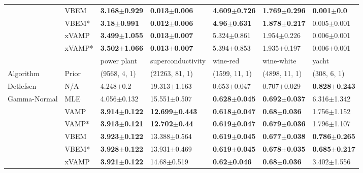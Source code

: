 \begin{tabular}{lllllll}
                 & VBEM &  \textbf{3.168$\pm$0.929} &  \textbf{0.013$\pm$0.006} &  \textbf{4.609$\pm$0.726} &  \textbf{1.769$\pm$0.296} &  \textbf{0.001$\pm$0.0} \\
                 & VBEM* &   \textbf{3.18$\pm$0.991} &  \textbf{0.012$\pm$0.006} &   \textbf{4.96$\pm$0.631} &  \textbf{1.878$\pm$0.217} &         0.005$\pm$0.001 \\
                 & xVAMP &  \textbf{3.499$\pm$1.055} &  \textbf{0.013$\pm$0.007} &           5.324$\pm$0.861 &           1.954$\pm$0.226 &         0.006$\pm$0.001 \\
                 & xVAMP* &  \textbf{3.502$\pm$1.066} &  \textbf{0.013$\pm$0.007} &           5.394$\pm$0.853 &           1.935$\pm$0.197 &         0.006$\pm$0.001 \\
\midrule
                 &        &               power plant &          superconductivity &                  wine-red &                wine-white &                     yacht \\
Algorithm & Prior& (9568, 4, 1)& (21263, 81, 1)& (1599, 11, 1)& (4898, 11, 1)& (308, 6, 1)\\
\midrule
Detlefsen & N/A &             4.248$\pm$0.2 &           19.313$\pm$1.163 &           0.653$\pm$0.047 &           0.707$\pm$0.029 &  \textbf{0.828$\pm$0.243} \\
Gamma-Normal & MLE &           4.056$\pm$0.132 &           15.551$\pm$0.507 &  \textbf{0.628$\pm$0.045} &  \textbf{0.692$\pm$0.037} &           6.316$\pm$1.342 \\
                 & VAMP &  \textbf{3.914$\pm$0.122} &  \textbf{12.699$\pm$0.443} &  \textbf{0.618$\pm$0.047} &   \textbf{0.68$\pm$0.036} &           1.756$\pm$1.152 \\
                 & VAMP* &  \textbf{3.913$\pm$0.121} &   \textbf{12.702$\pm$0.44} &  \textbf{0.619$\pm$0.047} &  \textbf{0.679$\pm$0.036} &           1.796$\pm$1.107 \\
                 & VBEM &  \textbf{3.923$\pm$0.122} &           13.388$\pm$0.564 &  \textbf{0.619$\pm$0.045} &  \textbf{0.677$\pm$0.038} &  \textbf{0.786$\pm$0.265} \\
                 & VBEM* &  \textbf{3.928$\pm$0.122} &           13.931$\pm$0.469 &  \textbf{0.619$\pm$0.045} &  \textbf{0.678$\pm$0.035} &  \textbf{0.685$\pm$0.217} \\
                 & xVAMP &  \textbf{3.921$\pm$0.122} &            14.68$\pm$0.519 &   \textbf{0.62$\pm$0.046} &   \textbf{0.68$\pm$0.036} &           3.402$\pm$1.556 \\

\end{tabular}
